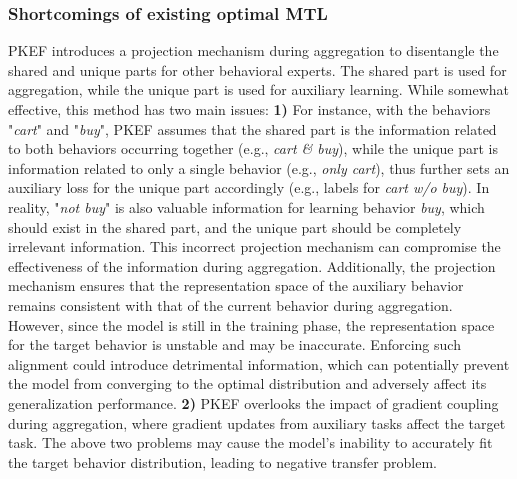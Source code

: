 \subsubsection{Shortcomings of existing optimal MTL}
\label{shortcoming_pkef}
PKEF introduces a projection mechanism during aggregation to disentangle the shared and unique parts for other behavioral experts. The shared part is used for aggregation, while the unique part is used for auxiliary learning. While somewhat effective, this method has two main issues: \textbf{1)} For instance, with the behaviors "\textit{cart}" and "\textit{buy}", PKEF assumes that the shared part is the information related to both behaviors occurring together (e.g., \textit{cart \& buy}), while the unique part is information related to only a single behavior (e.g., \textit{only cart}), thus further sets an auxiliary loss for the unique part accordingly (e.g., labels for \textit{cart w/o buy}). In reality, "\textit{not buy}" is also valuable information for learning behavior \textit{buy}, which should exist in the shared part, and the unique part should be completely irrelevant information. This incorrect projection mechanism can compromise the effectiveness of the information during aggregation. Additionally, the projection mechanism ensures that the representation space of the auxiliary behavior remains consistent with that of the current behavior during aggregation. However, since the model is still in the training phase, the representation space for the target behavior is unstable and may be inaccurate. Enforcing such alignment could introduce detrimental information, which can potentially prevent the model from converging to the optimal distribution and adversely affect its generalization performance. \textbf{2)} PKEF overlooks the impact of gradient coupling during aggregation, where gradient updates from auxiliary tasks affect the target task. The above two problems may cause the model's inability to accurately fit the target behavior distribution, leading to negative transfer problem. 

